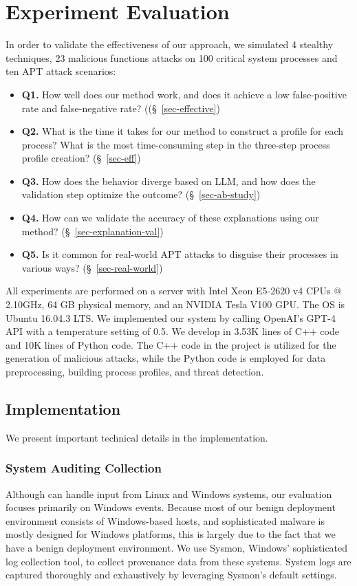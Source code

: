 \section{Experiment Evaluation}

In order to validate the effectiveness of our approach, we simulated 4 stealthy techniques, 23 malicious functions attacks on 100 critical system processes and ten APT attack scenarios:

\begin{itemize}
    \item \textbf{Q1.} How well does our method work, and does it achieve a low false-positive rate and false-negative rate? ((§~\ref{sec-effective})
    \item \textbf{Q2.} What is the time it takes for our method to construct a profile for each process? What is the most time-consuming step in the three-step process profile creation? (§~\ref{sec-eff})
    \item \textbf{Q3.} How does the behavior diverge based on LLM, and how does the validation step optimize the outcome? (§~\ref{sec-ab-study})
    \item \textbf{Q4.} How can we validate the accuracy of these explanations using our method? (§~\ref{sec-explanation-val})
    \item \textbf{Q5.} Is it common for real-world APT attacks to disguise their processes in various ways? (§~\ref{sec-real-world})
\end{itemize}
All experiments are performed on a server with Intel Xeon E5-2620 v4 CPUs @ 2.10GHz, 64 GB physical memory, and an NVIDIA Tesla V100 GPU. The OS is Ubuntu 16.04.3 LTS.
We implemented our system by calling OpenAI's GPT-4 API with a temperature setting of 0.5.
We develop \tool in 3.53K lines of C++ code and 10K lines of Python code.
The C++ code in the project is utilized for the generation of malicious attacks, while the Python code is employed for data preprocessing, building process profiles, and threat detection.


\subsection{Implementation}
We present important technical details in the implementation.

\subsubsection{System Auditing Collection}
Although \tool can handle input from Linux and Windows systems, our evaluation focuses primarily on Windows events. Because most of our benign deployment environment consists of Windows-based hosts, and sophisticated malware is mostly designed for Windows platforms, this is largely due to the fact that we have a benign deployment environment. We use Sysmon, Windows' sophisticated log collection tool, to collect provenance data from these systems. System logs are captured thoroughly and exhaustively by leveraging Sysmon's default settings.

